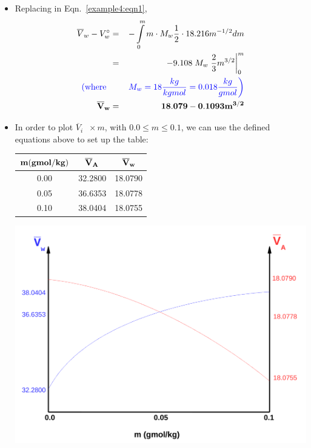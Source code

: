 \documentclass[12pts,a4paper,amsmath,amssymb,floatfix]{article}%
\renewcommand\leq{\leqslant}
\newcommand{\frc}{\displaystyle\frac}
\newcommand{\blue}{\textcolor{blue}}
\begin{document}
\begin{enumerate}[label=\bfseries Example \arabic*]
\begin{itemize}
  \item Replacing in Eqn.~\ref{example4:eqn1}, 
      \begin{eqnarray}
         \overline{V}_{w} - V_{w}^{\circ} &=& -\int\limits_{0}^{m} m\cdot M_{w} \frc{1}{2}\cdot 18.216 m^{-1/2} dm \nonumber \\
                                       &=& -9.108\; M_{w} \left. \frc{2}{3} m^{3/2}\right|_{0}^{m} \nonumber \\
         \blue{\left(\text{where }\right.}&& \blue{\left. M_{w} = 18 \frc{kg}{kgmol} = 0.018 \frc{kg}{gmol}\right)} \nonumber \\
         {\bf \overline{V}_{w}} &=& {\bf 18.079 - 0.1093 m^{3/2}} \nonumber 
      \end{eqnarray}

  \item In order to plot $\overline{V}_{i}\;\;\times m$, with $0.0\leq m\leq 0.1$, we can use the defined equations above to set  up the table:
        \begin{center}
          \begin{tabular}{|c | c c |}
            \hline
            ${\bf m (gmol/kg)}$ & ${\bf \overline{V}_{A}}$ & ${\bf \overline{V}_{w}}$ \\
            \hline
              0.00  & 32.2800 &  18.0790 \\
              0.05  & 36.6353 &  18.0778 \\
              0.10  & 38.0404 &  18.0755 \\
             \hline
          \end{tabular}
        \end{center}
          \begin{center}
              \includegraphics[width=0.75\columnwidth,clip]{./Pics/Example04_Pic}
          \end{center}


\end{itemize}

\end{enumerate} 

%
\end{document}
